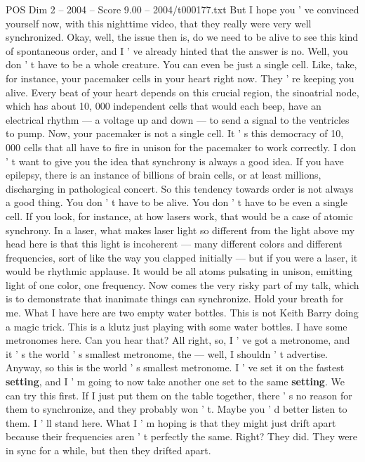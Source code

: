 \begin{textsample}{POS Dim 2 – 2004 – Score 9.00 – 2004/t000177.txt}
But I hope you ' ve convinced yourself now, with this nighttime video, that they really were very well synchronized.
Okay, well, the issue then is, do we need to be alive to see this kind of spontaneous order, and I ' ve already hinted that the answer is no.
Well, you don ' t have to be a whole creature.
You can even be just a single cell.
Like, take, for instance, your pacemaker cells in your heart right now.
They ' re keeping you alive.
Every beat of your heart depends on this crucial region, the sinoatrial node, which has about 10, 000 independent cells that would each beep, have an electrical rhythm — a voltage up and down — to send a signal to the ventricles to pump.
Now, your pacemaker is not a single cell.
It ' s this democracy of 10, 000 cells that all have to fire in unison for the pacemaker to work correctly.
I don ' t want to give you the idea that synchrony is always a good idea.
If you have epilepsy, there is an instance of billions of brain cells, or at least millions, discharging in pathological concert.
So this tendency towards order is not always a good thing.
You don ' t have to be alive.
You don ' t have to be even a single cell.
If you look, for instance, at how lasers work, that would be a case of atomic synchrony.
In a laser, what makes laser light so different from the light above my head here is that this light is incoherent — many different colors and different frequencies, sort of like the way you clapped initially — but if you were a laser, it would be rhythmic applause.
It would be all atoms pulsating in unison, emitting light of one color, one frequency.
Now comes the very risky part of my talk, which is to demonstrate that inanimate things can synchronize.
Hold your breath for me.
What I have here are two empty water bottles.
This is not Keith Barry doing a magic trick.
This is a klutz just playing with some water bottles.
I have some metronomes here.
Can you hear that?
All right, so, I ' ve got a metronome, and it ' s the world ' s smallest metronome, the — well, I shouldn ' t advertise.
Anyway, so this is the world ' s smallest metronome.
I ' ve set it on the fastest \textbf{setting}, and I ' m going to now take another one set to the same \textbf{setting}.
We can try this first.
If I just put them on the table together, there ' s no reason for them to synchronize, and they probably won ' t.
Maybe you ' d better listen to them.
I ' ll stand here.
What I ' m hoping is that they might just drift apart because their frequencies aren ' t perfectly the same.
Right?
They did.
They were in sync for a while, but then they drifted apart.

\end{textsample}

